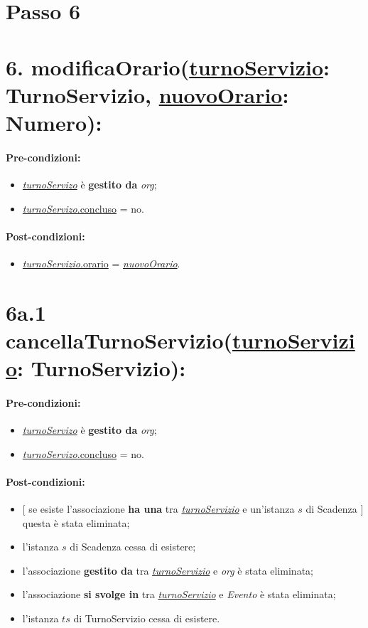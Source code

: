 \section{Passo 6}
\section*{6. modificaOrario(\underline{turnoServizio}: TurnoServizio, \underline{nuovoOrario}: Numero):}

\paragraph{Pre-condizioni:}
\begin{itemize}
   \item \underline{\textit{turnoServizo}} è \textbf{gestito da} {\textit{org}};
   \item \underline{\textit{turnoServizo}.concluso} = no.
\end{itemize}

\paragraph{Post-condizioni:}

\begin{itemize}
    \item \underline{\textit{turnoServizio}.orario} = \underline{\textit{nuovoOrario}}.
\end{itemize}

\section*{6a.1 cancellaTurnoServizio(\underline{turnoServizio}: TurnoServizio):}

\paragraph{Pre-condizioni:}
\begin{itemize}
   \item \underline{\textit{turnoServizo}} è \textbf{gestito da} {\textit{org}};
   \item \underline{\textit{turnoServizo}.concluso} = no.
\end{itemize}

\paragraph{Post-condizioni:} 
\begin{itemize}
    \item $[$ se esiste l'associazione \textbf{ha una} tra \underline{\textit{turnoServizio}} e un'istanza $s$ di Scadenza $]$ questa è stata eliminata;
 \item l'istanza $s$ di Scadenza cessa di esistere;
 \item l'associazione \textbf{gestito da} tra \underline{\textit{turnoServizio}} e \textit{org} è stata eliminata;
\item l'associazione \textbf{si svolge in} tra \underline{\textit{turnoServizio}} e \textit{Evento} è stata eliminata;
 \item l'istanza $ts$ di TurnoServizio cessa di esistere.
\end{itemize}
